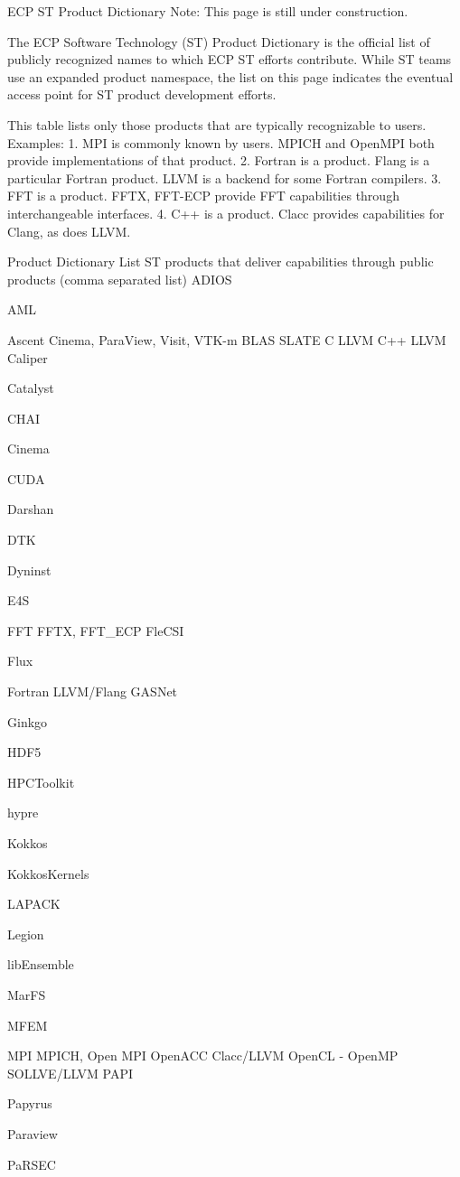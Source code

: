 ECP ST Product Dictionary
Note: This page is still under construction.

The ECP Software Technology (ST) Product Dictionary is the official list of publicly recognized 
names to which ECP ST efforts contribute.  While ST teams use an expanded product 
namespace, the list on this page indicates the eventual access point for ST product development 
efforts.

This table lists only those products that are typically recognizable to users. Examples:
1.	MPI is commonly known by users. MPICH and OpenMPI both provide implementations 
of that product.
2.	Fortran is a product. Flang is a particular Fortran product. LLVM is a backend for some 
Fortran compilers.
3.	FFT is a product. FFTX, FFT-ECP provide FFT capabilities through interchangeable 
interfaces. 
4.	C++ is a product. Clacc provides capabilities for Clang, as does LLVM.

Product 
Dictionary 
List
ST products that deliver capabilities through public products 
(comma separated list)
ADIOS

AML

Ascent
Cinema, ParaView, Visit, VTK-m
BLAS
SLATE
C
LLVM
C++
LLVM
Caliper

Catalyst

CHAI

Cinema

CUDA

Darshan

DTK

Dyninst

E4S

FFT
FFTX, FFT\_ECP
FleCSI

Flux

Fortran
LLVM/Flang
GASNet

Ginkgo

HDF5

HPCToolkit

hypre

Kokkos

KokkosKernels

LAPACK

Legion

libEnsemble

MarFS

MFEM

MPI
MPICH, Open MPI
OpenACC
Clacc/LLVM
OpenCL
-
OpenMP
SOLLVE/LLVM
PAPI

Papyrus

Paraview

PaRSEC

